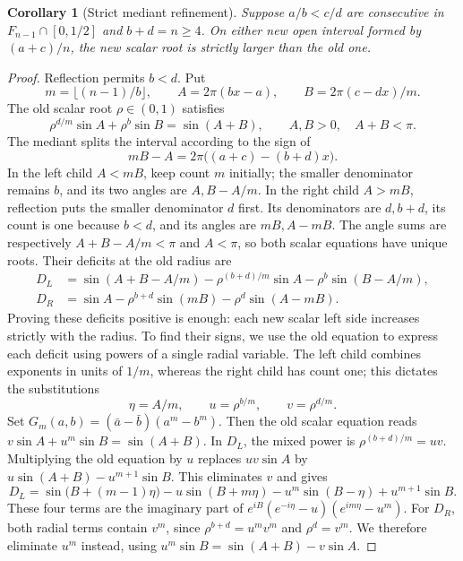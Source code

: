 \documentclass[11pt,a4paper]{article}
\newtheorem{corollary}[theorem]{Corollary}
\theoremstyle{definition}
\theoremstyle{remark}
\numberwithin{equation}{section}
\begin{document}
\begin{corollary}[Strict mediant refinement]\label{lem:positive-mediant}
Suppose $a/b<c/d$ are consecutive in $F_{n-1}\cap[0,1/2]$ and
$b+d=n\ge4$.  On either new open interval formed by $(a+c)/n$, the new scalar
root is strictly larger than the old one.
\end{corollary}
\begin{proof}
Reflection permits $b<d$.  Put
\[
 m=\lfloor(n-1)/b\rfloor,\qquad
 A=2\pi(bx-a),\qquad B=2\pi(c-dx)/m.
\]
The old scalar root $\rho\in(0,1)$ satisfies
\begin{equation}\label{eq:old-mediant-scalar}
 \rho^{d/m}\sin A+\rho^b\sin B=\sin(A+B),
 \qquad A,B>0,\quad A+B<\pi.
\end{equation}
The mediant splits the interval according to the sign of
\[
 mB-A=2\pi\bigl((a+c)-(b+d)x\bigr).
\]
In the left child $A<mB$, keep count $m$ initially; the smaller denominator
remains $b$, and its two angles are $A,B-A/m$.
In the right child $A>mB$, reflection puts the smaller denominator $d$
first.  Its denominators are $d,b+d$, its count is one because $b<d$,
and its angles are $mB,A-mB$.  The angle sums are respectively
$A+B-A/m<\pi$ and $A<\pi$, so both scalar equations have unique roots.
Their deficits at the old radius are
\begin{align*}
 D_L&=\sin(A+B-A/m)-\rho^{(b+d)/m}\sin A
                            -\rho^b\sin(B-A/m),\\
 D_R&=\sin A-\rho^{b+d}\sin(mB)-\rho^d\sin(A-mB).
\end{align*}
Proving these deficits positive is enough: each new scalar left side
increases strictly with the radius. To find their signs, we use the old
equation to express each deficit using powers of a single radial variable. The left
child combines exponents in units of $1/m$, whereas the right child
has count one; this dictates the substitutions
\[
 \eta=A/m,\qquad u=\rho^{b/m},\qquad v=\rho^{d/m}.
\]
Set $G_m(a,b)=(\bar a-\bar b)(a^m-b^m)$.
Then the old scalar equation reads
$v\sin A+u^m\sin B=\sin(A+B)$.
In $D_L$, the mixed power is $\rho^{(b+d)/m}=uv$.
Multiplying the old equation by $u$ replaces $uv\sin A$ by
$u\sin(A+B)-u^{m+1}\sin B$. This eliminates $v$ and gives
\[
 D_L=\sin\bigl(B+(m-1)\eta\bigr)-u\sin(B+m\eta)
       -u^m\sin(B-\eta)+u^{m+1}\sin B.
\]
These four terms are the imaginary part of
$e^{iB}(e^{-i\eta}-u)(e^{im\eta}-u^m)$.
For $D_R$, both radial terms contain $v^m$, since
$\rho^{b+d}=u^mv^m$ and $\rho^d=v^m$. We therefore eliminate $u^m$
instead, using
$u^m\sin B=\sin(A+B)-v\sin A$.

\end{proof}
\end{document}
